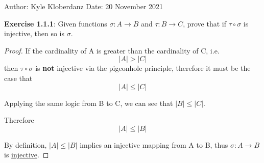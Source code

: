 \documentclass[a4paper]{article}
\begin{document}
\begin{myparindent}{0pt}

Author: Kyle Kloberdanz \newline
Date: 20 November 2021 \newline

\textbf{Exercise 1.1.1}:
Given functions $\sigma: A \rightarrow B$ and $\tau: B \rightarrow C$,
prove that if $\tau \circ \sigma$ is injective, then so is $\sigma$.

\begin{proof}
If the cardinality of A is greater than the cardinality of C, i.e.
\[|A| > |C|\]
then $\tau \circ \sigma$ is \textbf{not} injective via the
pigeonhole principle, therefore it must be the case that
\[|A| \le |C|\]

Applying the same logic from B to C, we can see that $|B| \le |C|$.

Therefore
\[|A| \le |B|\]

By definition, $|A| \le |B|$ implies an injective mapping from A to B,\newline
thus $\sigma: A \rightarrow B$ is \underline{injective}.
\end{proof}

\end{myparindent}
\end{document}
